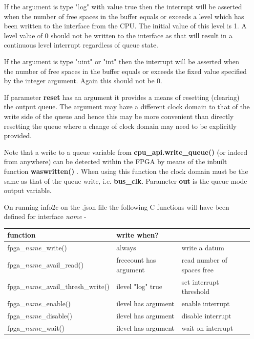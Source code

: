             If the argument is type "log" with value true then the interrupt will be
            asserted when the number of free spaces in the buffer equals or exceeds
            a level which has been written to the interface from the CPU. The
            initial value of this level is 1. A level value of 0 should not be
            written to the interface as that will result in a continuous level
            interrupt regardless of queue state.

            If the argument is type "uint" or "int" then the interrupt will be
            asserted when the number of free spaces in the buffer equals or exceeds
            the fixed value specified by the integer argument. Again this should not
            be 0.

            If parameter {\bf reset} has an argument it provides a means of
            resetting (clearing) the output queue. The argument may have a
            different clock domain to that of the write side of the queue and hence
            this may be more convenient than directly resetting the queue where a
            change of clock domain may need to be explicitly provided.

            Note that a write to a queue variable from {\bf cpu\_api.write\_queue()} (or
            indeed from anywhere) can be detected within the FPGA by means of the
            inbuilt function {\bf waswritten()} . When
            using this function the clock domain must be the same as that of the
            queue write, i.e. {\bf bus\_clk}.
            Parameter {\bf out} is the queue-mode output variable.
            
            On running info2c on the .json file the following C functions will have
            been defined for interface {\em name} -
            
            \begin{tabular}{| l | l | l |}
            \hline
            function                                 & write when?            &                            \\ \hline \hline
            fpga\_{\em name}\_write()                & always                 & write a datum              \\ \hline
            fpga\_{\em name}\_avail\_read()          & freecount has argument & read number of spaces free \\ \hline
            fpga\_{\em name}\_avail\_thresh\_write() & ilevel "log" true      & set interrupt threshold    \\ \hline
            fpga\_{\em name}\_enable()               & ilevel has argument    & enable interrupt           \\ \hline
            fpga\_{\em name}\_disable()              & ilevel has argument    & disable interrupt          \\ \hline 
            fpga\_{\em name}\_wait()                 & ilevel has argument    & wait on interrupt          \\ \hline  
            \end{tabular}


